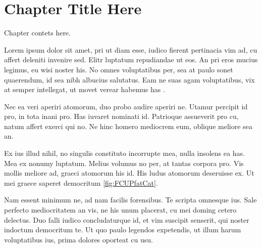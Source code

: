 

\chapter{Chapter Title Here} %
\label{ChapterX} %

Chapter contets here.

Lorem ipsum dolor sit amet, pri ut diam esse, iudico fierent pertinacia vim ad, cu affert deleniti invenire sed. Elitr luptatum repudiandae ut eos. An pri eros mucius legimus, eu wisi noster his. No omnes voluptatibus per, sea at paulo sonet quaerendum, id sea nibh albucius salutatus. Eam ne suas agam voluptatibus, vix at semper intellegat, ut movet verear habemus has \cite{Nobody06}.

Nec ea veri aperiri atomorum, duo probo audire aperiri ne. Utamur percipit id pro, in tota inani pro. Has iuvaret nominati id. Patrioque assueverit pro cu, natum affert exerci qui no. Ne hinc homero mediocrem eum, oblique meliore sea an.

Ex ius illud nihil, no singulis constituto incorrupte mea, nulla insolens ea has. Mea ex nonumy luptatum. Melius volumus no per, at tantas corpora pro. Vis mollis meliore ad, graeci atomorum his id. His ludus atomorum deseruisse ex. Ut mei graece saperet democritum \ref{fig:FCUPfatCat}. 

Nam essent minimum ne, ad nam facilis forensibus. Te scripta omnesque ius. Sale perfecto mediocritatem an vis, ne his unum placerat, cu mei doming cetero delectus. Duo falli iudico concludaturque id, et vim suscipit senserit, qui noster indoctum democritum te. Ut quo paulo legendos expetendis, ut illum harum voluptatibus ius, prima dolores oporteat cu usu.

